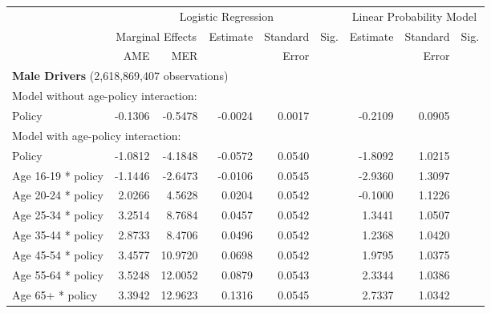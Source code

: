 
\begin{table}%
\centering 
\begin{tabular}{l r r r r l r r l} 

\hline 
 
 & \multicolumn{5}{c}{Logistic Regression}  & \multicolumn{3}{c}{Linear Probability Model} \\ 

 \cmidrule(lr){2-6}\cmidrule(lr){7-9} 
 & \multicolumn{2}{c}{Marginal Effects} & Estimate & Standard & Sig. & Estimate & Standard & Sig. \\ 

 \cmidrule(lr){2-3} 
 &   AME &  MER  &          &  Error   &      &          &  Error   &     \\ 

\hline 
 
\multicolumn{8}{l}{\textbf{Male Drivers} (2,618,869,407 observations)} \\ 

\hline
\multicolumn{8}{l}{Model without age-policy interaction: } \\ 
Policy                   &  -0.1306        &  -0.5478       &  -0.0024        &  0.0017       &            &  -0.2109        &  0.0905       &            \\ 
\hline
\multicolumn{8}{l}{Model with age-policy interaction: } \\ 
Policy                   &  -1.0812        &  -4.1848       &  -0.0572        &  0.0540       &            &  -1.8092        &  1.0215       &            \\ 
Age 16-19 * policy   &  -1.1446        &  -2.6473       &  -0.0106        &  0.0545       &            &  -2.9360        &  1.3097       &            \\ 
Age 20-24 * policy   &  2.0266        &  4.5628       &  0.0204        &  0.0542       &            &  -0.1000        &  1.1226       &            \\ 
Age 25-34 * policy   &  3.2514        &  8.7684       &  0.0457        &  0.0542       &            &  1.3441        &  1.0507       &            \\ 
Age 35-44 * policy   &  2.8733        &  8.4706       &  0.0496        &  0.0542       &            &  1.2368        &  1.0420       &            \\ 
Age 45-54 * policy   &  3.4577        &  10.9720       &  0.0698        &  0.0542       &            &  1.9795        &  1.0375       &            \\ 
Age 55-64 * policy   &  3.5248        &  12.0052       &  0.0879        &  0.0543       &            &  2.3344        &  1.0386       &            \\ 
Age 65+ * policy   &  3.3942        &  12.9623       &  0.1316        &  0.0545       &            &  2.7337        &  1.0342       &            \\ 


\end{tabular}
\end{table}
